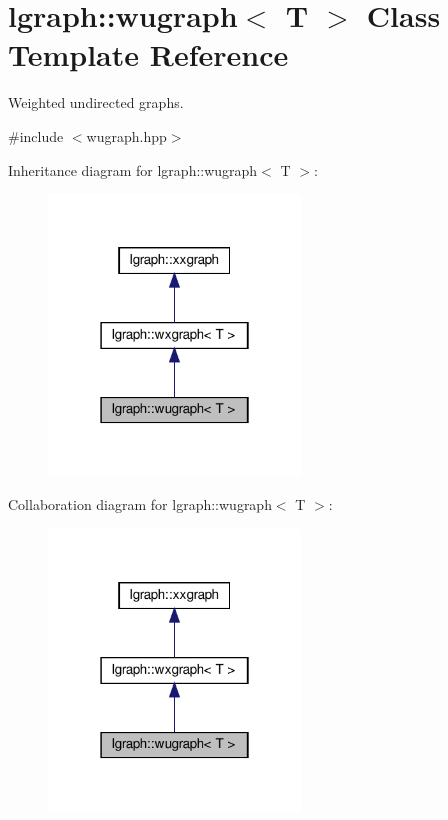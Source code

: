 \hypertarget{classlgraph_1_1wugraph}{}\section{lgraph\+:\+:wugraph$<$ T $>$ Class Template Reference}
\label{classlgraph_1_1wugraph}


Weighted undirected graphs.  




{\ttfamily \#include $<$wugraph.\+hpp$>$}



Inheritance diagram for lgraph\+:\+:wugraph$<$ T $>$\+:\nopagebreak
\begin{figure}[H]
\begin{center}
\leavevmode
\includegraphics[width=190pt]{classlgraph_1_1wugraph__inherit__graph}
\end{center}
\end{figure}


Collaboration diagram for lgraph\+:\+:wugraph$<$ T $>$\+:\nopagebreak
\begin{figure}[H]
\begin{center}
\leavevmode
\includegraphics[width=190pt]{classlgraph_1_1wugraph__coll__graph}
\end{center}
\end{figure}
